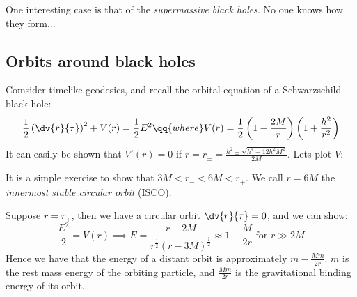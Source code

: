 \documentclass{jknotes}
\begin{document}
One interesting case is that of the \emph{supermassive black holes}. No one knows how they form...

\subsection{Orbits around black holes}
Comsider timelike geodesics, and recall the orbital equation of a Schwarzschild black hole:
\begin{equation}
    \frac{1}{2}\left( \dv{r}{\tau} \right)^2 + V(r) = \frac{1}{2}E^2
    \qq{where}
    V(r) = \frac{1}{2}\left( 1-\frac{2M}{r} \right)\left( 1 + \frac{h^2}{r^2} \right)
\end{equation}
It can easily be shown that \(V'(r)=0\) if \(r = r_\pm = \frac{h^2\pm\sqrt{h^4-12h^2M^2}}{2M}\). Lets plot \(V\):

\begin{figure}[H]
    \centering
\end{figure}
It is a simple exercise to show that \(3M < r_- < 6M < r_+\). We call \(r=6M\) the \emph{innermost stable circular orbit} (ISCO).

Suppose \(r=r_\pm\), then we have a circular orbit \(\dv{r}{\tau} = 0\), and we can show:
\begin{equation}
    \frac{E^2}{2}=V(r) \implies E = \frac{r-2M}{r^{\frac{1}{2}}(r-3M)^{\frac{1}{2}}} \approx 1 - \frac{M}{2r} \text{ for } r\gg2M
\end{equation}
Hence we have that the energy of a distant orbit is approximately \(m-\frac{Mm}{2r}\). \(m\) is the rest mass energy of the orbiting particle, and \(\frac{Mm}{2r}\) is the gravitational binding energy of its orbit.
\end{document}

